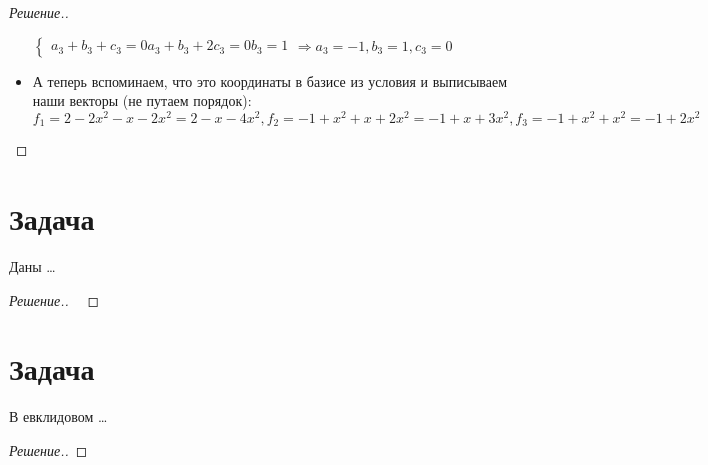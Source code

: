 \documentclass[a4paper]{article}
\theoremstyle{remark}
\begin{document}
\begin{proof}[Решение.]
\begin{itemize}
    $\begin{cases}
      a_3 + b_3 + c_3 = 0
      a_3 + b_3 + 2c_3 = 0
      b_3 = 1
  \end{cases} \Rightarrow a_3 = -1, b_3 = 1, c_3 = 0$ 
  \item А теперь вспоминаем, что это координаты в базисе из условия и выписываем
  наши векторы (не путаем порядок): $f_1 = 2 - 2x^2 - x -2x^2 = 2 - x -4x^2,
  f_2 = -1 + x^2  + x + 2x^2 = -1 + x + 3x^2,
  f_3 = -1 + x^2 + x^2 = -1 + 2x^2$ 
          \end{itemize}
        \end{proof}
    
    \section*{Задача }
        Даны \dots
        \begin{proof}[Решение.] \ 
            
        \end{proof}
      
    \section*{Задача }
        В евклидовом \dots
        \begin{proof}[Решение.]
            
        \end{proof}
    
\end{document}
